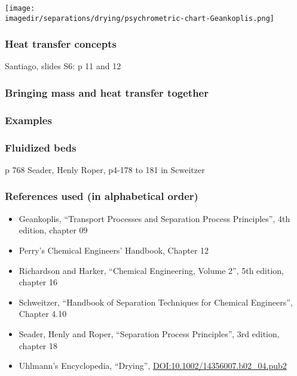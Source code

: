 \begin{frame}\frametitle{}
	\begin{center}
		\texttt{[image: \\imagedir/separations/drying/psychrometric-chart-Geankoplis.png]}
	\end{center}
\end{frame}

\begin{frame}\frametitle{Heat transfer concepts}
	Santiago, slides S6: p 11 and 12 
\end{frame}

\begin{frame}\frametitle{Bringing mass and heat transfer together}
	
\end{frame}

\begin{frame}\frametitle{Examples}
	
\end{frame}

\begin{frame}\frametitle{Fluidized beds}
	p 768 Seader, Henly Roper,
	p4-178 to 181 in Scweitzer
\end{frame}


\begin{frame}\frametitle{References used (in alphabetical order)}
	\begin{itemize}
		\item	Geankoplis, ``Transport Processes and Separation Process Principles'', 4th edition, chapter 09
		\item	Perry's Chemical Engineers' Handbook, Chapter 12
		\item	Richardson and Harker, ``Chemical Engineering, Volume 2'', 5th edition, chapter 16	
		\item	Schweitzer, ``Handbook of Separation Techniques for Chemical Engineers'', Chapter 4.10
		\item	Seader, Henly and Roper, ``Separation Process Principles'', 3rd edition, chapter 18
		\item	Uhlmann's Encyclopedia, ``Drying'', {\tiny \href{http://dx.doi.org/10.1002/14356007.b02\_04.pub2}{DOI:10.1002/14356007.b02\_04.pub2}}
	\end{itemize}
\end{frame}